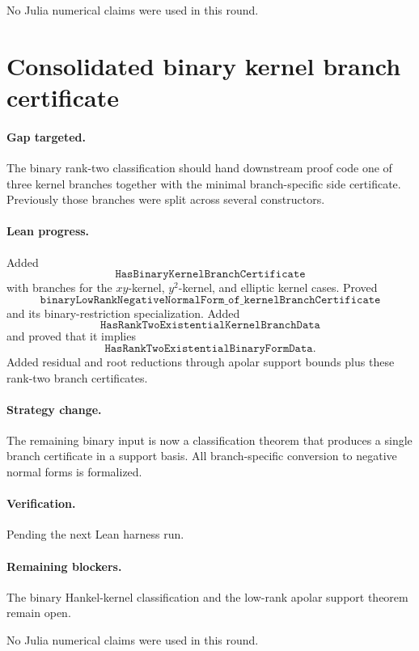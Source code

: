 \documentclass[11pt]{article}
\begin{document}
No Julia numerical claims were used in this round.

\section*{Consolidated binary kernel branch certificate}

\paragraph{Gap targeted.}
The binary rank-two classification should hand downstream proof code one of
three kernel branches together with the minimal branch-specific side
certificate.  Previously those branches were split across several constructors.

\paragraph{Lean progress.}
Added
\[
\texttt{HasBinaryKernelBranchCertificate}
\]
with branches for the \(xy\)-kernel, \(y^2\)-kernel, and elliptic kernel cases.
Proved
\[
\texttt{binaryLowRankNegativeNormalForm\_of\_kernelBranchCertificate}
\]
and its binary-restriction specialization.  Added
\[
\texttt{HasRankTwoExistentialKernelBranchData}
\]
and proved that it implies
\[
\texttt{HasRankTwoExistentialBinaryFormData}.
\]
Added residual and root reductions through apolar support bounds plus these
rank-two branch certificates.

\paragraph{Strategy change.}
The remaining binary input is now a classification theorem that produces a
single branch certificate in a support basis.  All branch-specific conversion
to negative normal forms is formalized.

\paragraph{Verification.}
Pending the next Lean harness run.

\paragraph{Remaining blockers.}
The binary Hankel-kernel classification and the low-rank apolar support theorem
remain open.

No Julia numerical claims were used in this round.
\end{document}
